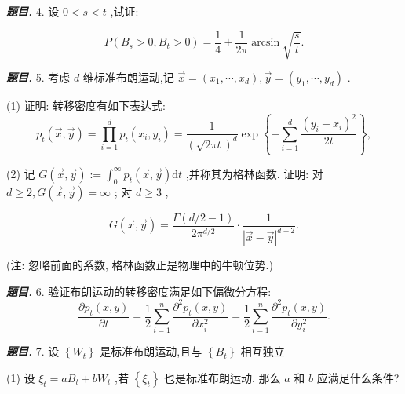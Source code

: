 \documentclass[10pt, a4paper, oneside]{ctexart}
\newenvironment{problem}{\begin{framed}\par\noindent\textbf{\textit{题目. }}}{\end{framed}\par}
\begin{document}
\begin{problem}
    4. 设 \( 0 < s < t \) ,试证:

\[P\left( {{B}_{s} > 0,{B}_{t} > 0}\right)  = \frac{1}{4} + \frac{1}{2\pi }\arcsin \sqrt{\frac{s}{t}}.\]
\end{problem}

\begin{problem}
    5. 考虑 \( d \) 维标准布朗运动,记 \( \overrightarrow{x} = \left( {{x}_{1},\cdots ,{x}_{d}}\right) ,\overrightarrow{y} = \left( {{y}_{1},\cdots ,{y}_{d}}\right)  \) .

(1) 证明: 转移密度有如下表达式:
\[{p}_{t}\left( {\overrightarrow{x},\overrightarrow{y}}\right)  = \mathop{\prod }\limits_{{i = 1}}^{d}{p}_{t}\left( {{x}_{i},{y}_{i}}\right)  = \frac{1}{{\left( \sqrt{2\pi t}\right) }^{d}}\exp \left\{  {-\mathop{\sum }\limits_{{i = 1}}^{d}\frac{{\left( {y}_{i} - {x}_{i}\right) }^{2}}{2t}}\right\}  ,\]

(2) 记 \( G\left( {\overrightarrow{x},\overrightarrow{y}}\right)  \mathrel{\text{:=}} {\int }_{0}^{\infty }{p}_{t}\left( {\overrightarrow{x},\overrightarrow{y}}\right) \mathrm{d}t \) ,并称其为格林函数. 证明: 对 \( d \geq  2,G\left( {\overrightarrow{x},\overrightarrow{y}}\right)  = \infty  \) ; 对 \( d \geq  3 \) ,

\[G\left( {\overrightarrow{x},\overrightarrow{y}}\right)  = \frac{\Gamma \left( {d/2 - 1}\right) }{2{\pi }^{d/2}} \cdot  \frac{1}{{\left| \overrightarrow{x} - \overrightarrow{y}\right| }^{d - 2}}.\]

(注: 忽略前面的系数, 格林函数正是物理中的牛顿位势.)
\end{problem}

\begin{problem}
    6. 验证布朗运动的转移密度满足如下偏微分方程:
\[\frac{\partial {p}_{t}\left( {x,y}\right) }{\partial t} = \frac{1}{2}\mathop{\sum }\limits_{{i = 1}}^{n}\frac{{\partial }^{2}{p}_{t}\left( {x,y}\right) }{\partial {x}_{i}^{2}} = \frac{1}{2}\mathop{\sum }\limits_{{i = 1}}^{n}\frac{{\partial }^{2}{p}_{t}\left( {x,y}\right) }{\partial {y}_{i}^{2}}.\]
\end{problem}

\begin{problem}
    7. 设 \( \left\{  {W}_{t}\right\}   \) 是标准布朗运动,且与 \( \left\{  {B}_{t}\right\}   \) 相互独立

(1) 设 \( {\xi }_{t} = a{B}_{t} + b{W}_{t} \) ,若 \( \left\{  {\xi }_{t}\right\}   \) 也是标准布朗运动. 那么 \( a \) 和 \( b \) 应满足什么条件?
\end{problem}
\end{document}
